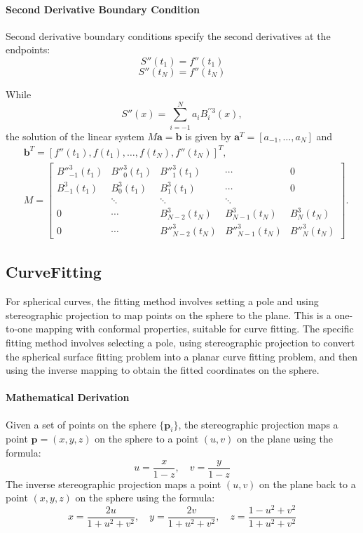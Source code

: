 \documentclass[a4paper]{article}
\begin{document}
\begin{sloppypar}
\paragraph*{Second Derivative Boundary Condition}
Second derivative boundary conditions specify the second derivatives at the endpoints:
\[ S''(t_1) = f''(t_1) \]
\[ S''(t_N) = f''(t_N) \]

While $$
S''(x)=\sum_{i=-1}^{N}a_iB^{\prime \prime 3}_i(x),
$$
the solution of the linear system $M \mathbf{a} = \mathbf{b}$ is given by
$\mathbf{a}^T = [a_{-1}, \ldots, a_{N}]$
and
$$
\begin{aligned}
&\mathbf{b}^T = \left[ f''(t_1), f(t_1), \ldots, f(t_{N}), f''(t_N) \right]^T, \\
&M = \begin{bmatrix}
B''^3_{-1}(t_1) & B''^3_{0}(t_1) & B''^3_{1}(t_1)  & \cdots &0\\
B^3_{-1}(t_1) & B^3_{0}(t_1) & B^3_{1}(t_1)  & \cdots &0\\
& \ddots & \ddots & \ddots \\
0&\cdots& B^3_{N-2}(t_N) & B^3_{N-1}(t_N) & B^3_{N}(t_N) \\
0&\cdots&B''^3_{N-2}(t_N) & B''^3_{N-1}(t_N) & B''^3_{N}(t_N)
\end{bmatrix}.
\end{aligned}
$$

\subsection{CurveFitting}
For spherical curves, the fitting method involves setting a pole and using stereographic projection to map points on the sphere to the plane. This is a one-to-one mapping with conformal properties, suitable for curve fitting. The specific fitting method involves selecting a pole, using stereographic projection to convert the spherical surface fitting problem into a planar curve fitting problem, and then using the inverse mapping to obtain the fitted coordinates on the sphere.

\paragraph*{Mathematical Derivation}
Given a set of points on the sphere \(\{\mathbf{p}_i\}\), the stereographic projection maps a point \(\mathbf{p} = (x, y, z)\) on the sphere to a point \((u, v)\) on the plane using the formula:
\[ u = \frac{x}{1 - z}, \quad v = \frac{y}{1 - z} \]
The inverse stereographic projection maps a point \((u, v)\) on the plane back to a point \((x, y, z)\) on the sphere using the formula:
\[ x = \frac{2u}{1 + u^2 + v^2}, \quad y = \frac{2v}{1 + u^2 + v^2}, \quad z = \frac{1 - u^2 + v^2}{1 + u^2 + v^2} \]


\end{sloppypar}
\end{document}
